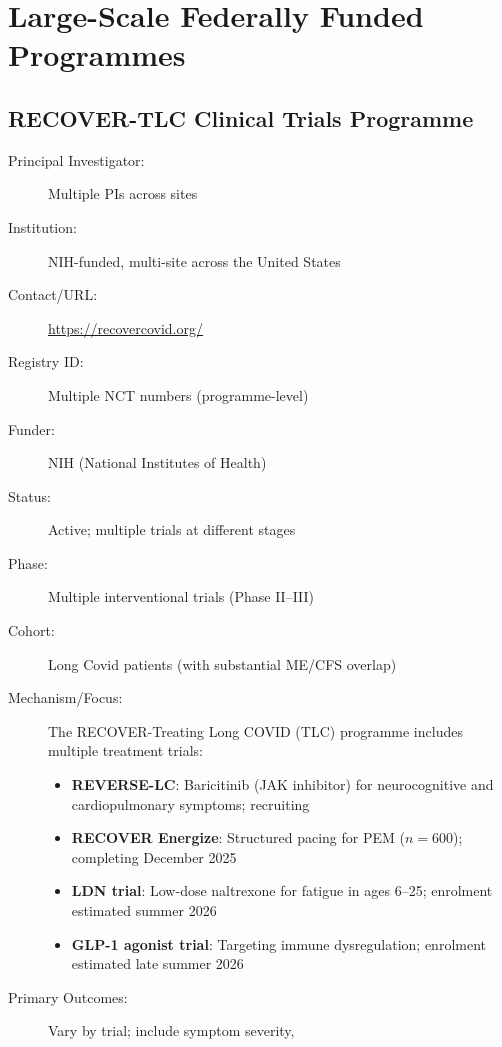 \section{Large-Scale Federally Funded Programmes}
\label{sec:registry-federal}

\subsection{RECOVER-TLC Clinical Trials Programme}
\label{sec:registry-recover}

\begin{description}
    \item[Principal Investigator:] Multiple PIs across sites
    \item[Institution:] NIH-funded, multi-site across the United States
    \item[Contact/URL:] \url{https://recovercovid.org/}
    \item[Registry ID:] Multiple NCT numbers (programme-level)
    \item[Funder:] NIH (National Institutes of Health)
    \item[Status:] Active; multiple trials at different stages
    \item[Phase:] Multiple interventional trials (Phase II--III)
    \item[Cohort:] Long Covid patients (with substantial ME/CFS overlap)
    \item[Mechanism/Focus:] The RECOVER-Treating Long COVID (TLC) programme
        includes multiple treatment trials:
        \begin{itemize}
            \item \textbf{REVERSE-LC}: Baricitinib (JAK inhibitor) for
                neurocognitive and cardiopulmonary symptoms; recruiting
            \item \textbf{RECOVER Energize}: Structured pacing for PEM
                ($n=600$); completing December 2025
            \item \textbf{LDN trial}: Low-dose naltrexone for fatigue in
                ages 6--25; enrolment estimated summer 2026
            \item \textbf{GLP-1 agonist trial}: Targeting immune
                dysregulation; enrolment estimated late summer 2026
        \end{itemize}
    \item[Primary Outcomes:] Vary by trial; include symptom severity,

\end{description}
